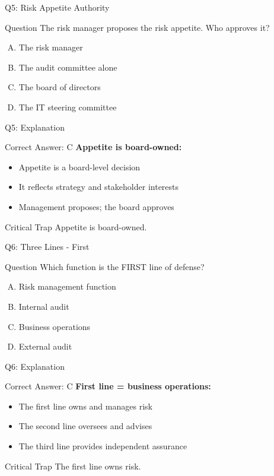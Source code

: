 \documentclass{beamer}
\begin{document}
	\begin{frame}{Q5: Risk Appetite Authority}
		\begin{block}{Question}
			The risk manager proposes the risk appetite. Who approves it?
		\end{block}
		\begin{enumerate}[(A)]
			\item The risk manager
			\item The audit committee alone
			\item The board of directors
			\item The IT steering committee
		\end{enumerate}
	\end{frame}
	
	\begin{frame}{Q5: Explanation}
		\begin{block}{Correct Answer: C}
			\textbf{Appetite is board-owned:}
			\begin{itemize}
				\item Appetite is a board-level decision
				\item It reflects strategy and stakeholder interests
				\item Management proposes; the board approves
			\end{itemize}
		\end{block}
		\begin{alertblock}{Critical Trap}
			Appetite is board-owned.
		\end{alertblock}
	\end{frame}
	
	\begin{frame}{Q6: Three Lines - First}
		\begin{block}{Question}
			Which function is the FIRST line of defense?
		\end{block}
		\begin{enumerate}[(A)]
			\item Risk management function
			\item Internal audit
			\item Business operations
			\item External audit
		\end{enumerate}
	\end{frame}
	
	\begin{frame}{Q6: Explanation}
		\begin{block}{Correct Answer: C}
			\textbf{First line = business operations:}
			\begin{itemize}
				\item The first line owns and manages risk
				\item The second line oversees and advises
				\item The third line provides independent assurance
			\end{itemize}
		\end{block}
		\begin{alertblock}{Critical Trap}
			The first line owns risk.
		\end{alertblock}
	\end{frame}
	
\end{document}
